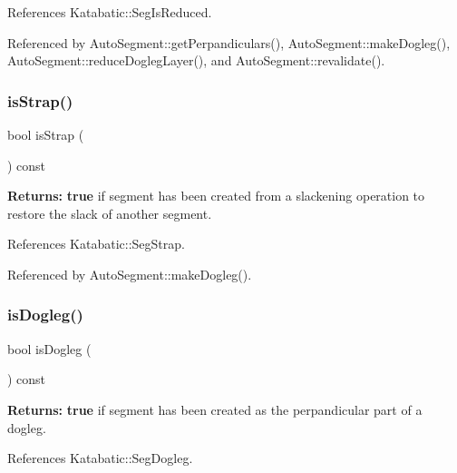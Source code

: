 References Katabatic\+::\+Seg\+Is\+Reduced.



Referenced by Auto\+Segment\+::get\+Perpandiculars(), Auto\+Segment\+::make\+Dogleg(), Auto\+Segment\+::reduce\+Dogleg\+Layer(), and Auto\+Segment\+::revalidate().

\mbox{\label{classKatabatic_1_1AutoSegment_a62d61c231cf404a814ae37665fa8164f}} 
\subsubsection{\texorpdfstring{is\+Strap()}{isStrap()}}
{\footnotesize\ttfamily bool is\+Strap (\begin{DoxyParamCaption}{ }\end{DoxyParamCaption}) const\hspace{0.3cm}{\ttfamily [inline]}}

{\bfseries Returns\+:} {\bfseries true} if segment has been created from a slackening operation to restore the slack of another segment. 

References Katabatic\+::\+Seg\+Strap.



Referenced by Auto\+Segment\+::make\+Dogleg().

\mbox{\label{classKatabatic_1_1AutoSegment_a75d91371e5281dd21f60ff39ae70a3e5}} 
\subsubsection{\texorpdfstring{is\+Dogleg()}{isDogleg()}}
{\footnotesize\ttfamily bool is\+Dogleg (\begin{DoxyParamCaption}{ }\end{DoxyParamCaption}) const\hspace{0.3cm}{\ttfamily [inline]}}

{\bfseries Returns\+:} {\bfseries true} if segment has been created as the perpandicular part of a dogleg. 

References Katabatic\+::\+Seg\+Dogleg.



